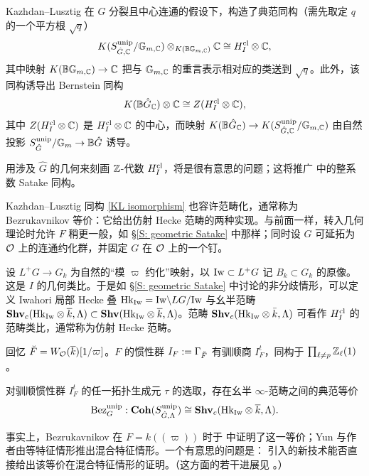 Kazhdan--Lusztig \cite{Kazhdan-Lusztig-Iwahori} 在 $G$ 分裂且中心连通的假设下，构造了典范同构（需先取定 $q$ 的一个平方根 $\sqrt{q}$）
\begin{equation}\label{KL isomorphism}
K(S^{{\operatorname{unip}}}_{\hat{G},{\mathbb C}}/{\mathbb G}_{m,{\mathbb C}})\otimes_{K({\mathbb B}{\mathbb G}_{m,{\mathbb C}})}{\mathbb C}\cong H^{{\operatorname{cl}}}_I\otimes{\mathbb C},
\end{equation}
其中映射 $K({\mathbb B}{\mathbb G}_{m,{\mathbb C}})\to {\mathbb C}$ 把与 ${\mathbb G}_{m,{\mathbb C}}$ 的重言表示相对应的类送到 $\sqrt{q}$。此外，该同构诱导出 Bernstein 同构
\begin{equation}\label{Bernstein isomorphism}
K({\mathbb B} \hat{G}_{\mathbb C})\otimes{\mathbb C}\cong Z(H^{{\operatorname{cl}}}_I\otimes{\mathbb C}),
\end{equation}
其中 $Z(H^{{\operatorname{cl}}}_I\otimes{\mathbb C})$ 是 $H^{{\operatorname{cl}}}_I\otimes{\mathbb C}$ 的中心，而映射 $K({\mathbb B} \hat{G}_{\mathbb C})\to K(S^{{\operatorname{unip}}}_{\hat{G},{\mathbb C}}/{\mathbb G}_{m,{\mathbb C}})$ 由自然投影 $S^{{\operatorname{unip}}}_{\hat{G}}/{\mathbb G}_m\to {\mathbb B}\hat{G}$ 诱导。

\begin{rmk}
用涉及 $\hat{G}$ 的几何来刻画 ${\mathbb Z}$-代数 $H^{{\operatorname{cl}}}_I$，将是很有意思的问题；这将推广 \cite{Zhu-Integral-Satake} 中的整系数 Satake 同构。
\end{rmk}

Kazhdan--Lusztig 同构 \eqref{KL isomorphism} 也容许范畴化，通常称为 Bezrukavnikov 等价：它给出仿射 Hecke 范畴的两种实现。与前面一样，转入几何理论时允许 $F$ 稍更一般，如 \S\ref{S: geometric Satake} 中那样；同时设 $G$ 可延拓为 ${\mathcal O}$ 上的连通约化群，并固定 $G$ 在 ${\mathcal O}$ 上的一个钉。

设 $L^+G\to G_k$ 为自然的“模 $\varpi$ 约化”映射，以 ${\operatorname{Iw}}\subset L^+G$ 记 $B_k\subset G_k$ 的原像。这是 $I$ 的几何类比。于是如 \S\ref{S: geometric Satake} 中讨论的非分歧情形，可以定义 Iwahori 局部 Hecke 叠 ${\operatorname{Hk}}_{{\operatorname{Iw}}}= {\operatorname{Iw}}\backslash LG/{\operatorname{Iw}}$ 与幺半范畴
${\mathbf{Shv}}_{c}({\operatorname{Hk}}_{{\operatorname{Iw}}}\otimes\overline k,{\Lambda})\subset{\mathbf{Shv}}({\operatorname{Hk}}_{{\operatorname{Iw}}}\otimes\overline k,{\Lambda})$。范畴 ${\mathbf{Shv}}_{c}({\operatorname{Hk}}_{{\operatorname{Iw}}}\otimes\bar k,{\Lambda})$ 可看作 $H^{{\operatorname{cl}}}_I$ 的范畴类比，通常称为仿射 Hecke 范畴。

回忆 $\breve F=W_{\mathcal O}(\overline k)[1/\varpi]$。$F$ 的惯性群 $I_F:={\Gamma}_{\breve F}$ 有驯顺商 $I_F^t$，同构于 $\prod_{\ell\neq p} {\mathbb Z}_\ell(1)$。

\begin{thm} \label{T: Bezrukavnikov equivalence}
对驯顺惯性群 $I_F^t$ 的任一拓扑生成元 $\tau$ 的选取，存在幺半 $\infty$-范畴之间的典范等价
\[
\operatorname{Bez}^{{\operatorname{unip}}}_G:   {\mathbf{Coh}}(S^{{\operatorname{unip}}}_{\hat{G},{\Lambda}})\cong {\mathbf{Shv}}_{c}({\operatorname{Hk}}_{{\operatorname{Iw}}}\otimes\overline k,{\Lambda}).
\]
\end{thm}

事实上，Bezrukavnikov 在 $F=k(\!(\varpi)\!)$ 时于 \cite{Bezrukavnikov-Affine-Hecke} 中证明了这一等价；Yun 与作者由等特征情形推出混合特征情形。一个有意思的问题是：\cite{Scholze-Berkeley, Fargues-Scholze-Geometrization} 引入的新技术能否直接给出该等价在混合特征情形的证明。（这方面的若干进展见 \cite{AGLR}。）


